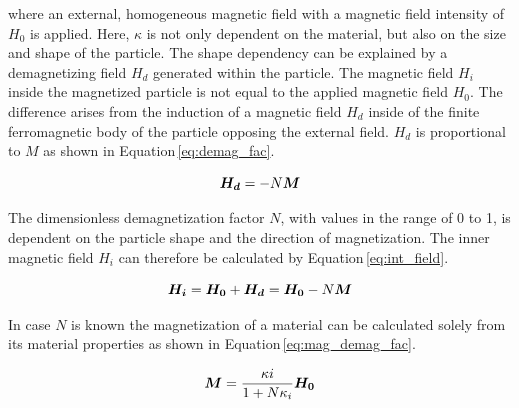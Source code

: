 where an external, homogeneous magnetic field with a magnetic field intensity of $H_{0}$ is applied. Here, $\kappa$ is not only dependent on the material, but also on the size and shape of the particle. The shape dependency can be explained by a demagnetizing field $H_{d}$ generated within the particle. The magnetic field $H_{i}$ inside the magnetized particle is not equal to the applied magnetic field $H_{0}$. The difference arises from the induction of a magnetic field $H_{d}$ inside of the finite ferromagnetic body of the particle opposing the external field. $H_{d}$ is proportional to $M$ as shown in Equation\,\ref{eq:demag_fac}. 

\begin{equation}
\label{eq:demag_fac}
\centering
\boldsymbol{H_{d}} = -N\boldsymbol{M}
\end{equation}

The dimensionless demagnetization factor $N$, with values in the range of 0 to 1, is dependent on the particle shape and the direction of magnetization. The inner magnetic field $H_{i}$ can therefore be calculated by Equation\,\ref{eq:int_field}. 

\begin{equation}
\label{eq:int_field}
\centering
\boldsymbol{H_{i}} = \boldsymbol{H_{0}} + \boldsymbol{H_{d}} = \boldsymbol{H_{0}} - N\boldsymbol{M}
\end{equation}

In case $N$ is known the magnetization of a material can be calculated solely from its material properties as shown in Equation\,\ref{eq:mag_demag_fac}. 

\begin{equation}
\label{eq:mag_demag_fac}
\centering
\boldsymbol{M} = \frac{\kappa{i}}{1+N\kappa_{i}}\boldsymbol{H_{0}}
\end{equation}

